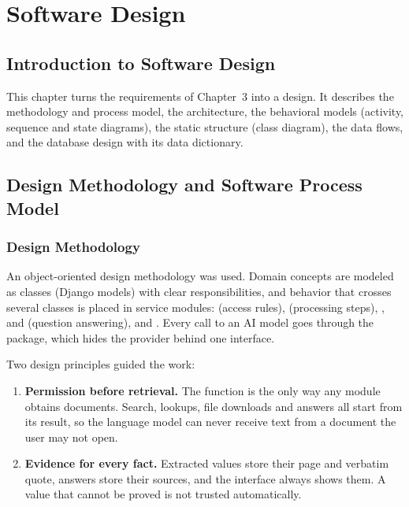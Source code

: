 \chapter{Software Design}

\section{Introduction to Software Design}
This chapter turns the requirements of Chapter~3 into a design. It describes the methodology and
process model, the architecture, the behavioral models (activity, sequence and state diagrams), the
static structure (class diagram), the data flows, and the database design with its data dictionary.

\section{Design Methodology and Software Process Model}
\subsection{Design Methodology}
An object-oriented design methodology was used. Domain concepts are modeled as classes (Django
models) with clear responsibilities, and behavior that crosses several classes is placed in service
modules:  (access rules),  (processing steps),
,  and  (question
answering),  and . Every call to an AI model
goes through the  package, which hides the provider behind one interface.

Two design principles guided the work:
\begin{enumerate}
\item \textbf{Permission before retrieval.} The function  is the only
way any module obtains documents. Search, lookups, file downloads and answers all start from its result,
so the language model can never receive text from a document the user may not open.
\item \textbf{Evidence for every fact.} Extracted values store their page and verbatim quote, answers
store their sources, and the interface always shows them. A value that cannot be proved is not trusted
automatically.
\end{enumerate}

